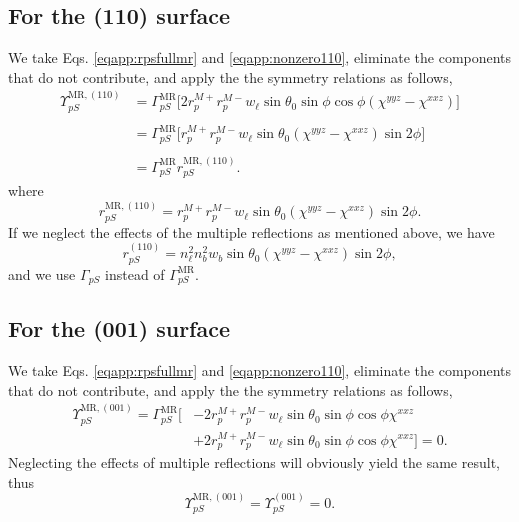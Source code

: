 \subsection{For the (110) surface}

We take Eqs. \eqref{eqapp:rpsfullmr} and \eqref{eqapp:nonzero110}, eliminate the
components that do not contribute, and apply the the symmetry relations as
follows,
\begin{equation*}
\begin{split}
\Upsilon^{\mathrm{MR},(110)}_{pS} &= 
\Gamma^{\mathrm{MR}}_{pS}
\big[
2r^{M+}_{p}r^{M-}_{p}w_{\ell}\sin\theta_{0}\sin\phi\cos\phi
(\chi^{yyz} - \chi^{xxz})
\big]\\\\\
&= 
\Gamma^{\mathrm{MR}}_{pS}
\big[
r^{M+}_{p}r^{M-}_{p}w_{\ell}\sin\theta_{0}(\chi^{yyz} - \chi^{xxz})\sin2\phi
\big]\\\\
&= 
\Gamma^{\mathrm{MR}}_{pS}r^{\mathrm{MR},(110)}_{pS}.
\end{split}
\end{equation*}
where
\begin{equation}\label{eqapp:final-rps.mr.110}
r^{\mathrm{MR},(110)}_{pS} =
r^{M+}_{p}r^{M-}_{p}w_{\ell}\sin\theta_{0}(\chi^{yyz} - \chi^{xxz})\sin2\phi.
\end{equation}
If we neglect the effects of the multiple reflections as mentioned above, we
have
\begin{equation}\label{eqapp:final-rps.110}
r^{(110)}_{pS} = 
n^{2}_{\ell}n^{2}_{b}w_{b}\sin\theta_{0}(\chi^{yyz} - \chi^{xxz})\sin2\phi,
\end{equation}
and we use $\Gamma_{pS}$ instead of $\Gamma^{\mathrm{MR}}_{pS}$.


\subsection{For the (001) surface}

We take Eqs. \eqref{eqapp:rpsfullmr} and \eqref{eqapp:nonzero110}, eliminate the
components that do not contribute, and apply the the symmetry relations as
follows,
\begin{equation*}
\begin{split}
\Upsilon^{\mathrm{MR},(001)}_{pS}
= 
\Gamma^{\mathrm{MR}}_{pS}
\big[
&- 2r^{M+}_{p}r^{M-}_{p}w_{\ell}\sin\theta_{0}\sin\phi\cos\phi\chi^{xxz}\\
&+ 2r^{M+}_{p}r^{M-}_{p}w_{\ell}\sin\theta_{0}\sin\phi\cos\phi\chi^{xxz}
\big] = 0.
\end{split}
\end{equation*}
Neglecting the effects of multiple reflections will obviously yield the same
result, thus
\begin{equation}\label{eqapp:final-rps.mr.001}
\Upsilon^{\mathrm{MR},(001)}_{pS} = \Upsilon^{(001)}_{pS} = 0.
\end{equation}


